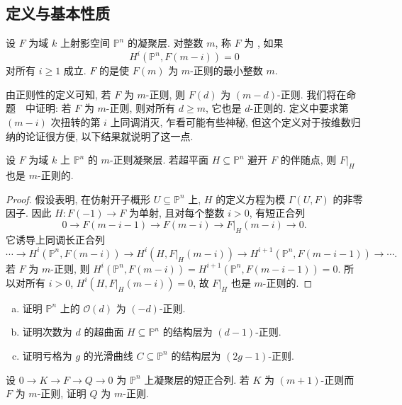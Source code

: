 \subsection{定义与基本性质}\label{src:2.3.1-subsection}
\begin{definition}\label{src:2.3.1}
设 $F$ 为域 $k$ 上射影空间 $\mathbb P^n$ 的凝聚层.
对整数 $m$, 称 $F$ 为 , 如果
\[
H^i(\mathbb P^n,F(m-i))=0
\]
对所有 $i\geq1$ 成立.
$F$ 的是使 $F(m)$ 为 $m$-正则的最小整数 $m$.
\end{definition}
由正则性的定义可知, 若 $F$ 为 $m$-正则, 则 $F(d)$ 为 $(m-d)$-正则.
我们将在命题~~中证明: 若 $F$ 为 $m$-正则, 则对所有 $d\geq m$, 它也是 $d$-正则的.
定义中要求第 $(m-i)$ 次扭转的第 $i$ 上同调消灭, 乍看可能有些神秘, 但这个定义对于按维数归纳的论证很方便, 以下结果就说明了这一点.
\begin{lemma}\label{src:2.3.2}
设 $F$ 为域 $k$ 上 $\mathbb P^n$ 的 $m$-正则凝聚层.
若超平面 $H\subseteq\mathbb P^n$ 避开 $F$ 的伴随点, 则 $F|_H$ 也是 $m$-正则的.
\end{lemma}
\begin{proof}
假设表明, 在仿射开子概形 $U\subseteq\mathbb P^n$ 上, $H$ 的定义方程为模 $\Gamma(U,F)$ 的非零因子.
因此 $H:F(-1)\to F$ 为单射, 且对每个整数 $i>0$, 有短正合列
\[
0\longrightarrow F(m-i-1)\longrightarrow F(m-i)
\longrightarrow F|_H(m-i)\longrightarrow0.
\]
它诱导上同调长正合列
\[
\cdots\longrightarrow H^i(\mathbb P^n,F(m-i))
\longrightarrow H^i(H,F|_H(m-i))
\longrightarrow H^{i+1}(\mathbb P^n,F(m-i-1))\longrightarrow\cdots.
\]
若 $F$ 为 $m$-正则, 则
$H^i(\mathbb P^n,F(m-i))=H^{i+1}(\mathbb P^n,F(m-i-1))=0$.
所以对所有 $i>0$, $H^i(H,F|_H(m-i))=0$, 故 $F|_H$ 也是 $m$-正则的.
\end{proof}
\begin{exercise}[简单, 适合练习]\label{src:2.3.3}
\begin{enumerate}[(a)]
\item 证明 $\mathbb P^n$ 上的 $\mathcal O(d)$ 为 $(-d)$-正则.
\item 证明次数为 $d$ 的超曲面 $H\subseteq\mathbb P^n$ 的结构层为 $(d-1)$-正则.
\item 证明亏格为 $g$ 的光滑曲线 $C\subseteq\mathbb P^n$ 的结构层为 $(2g-1)$-正则.
\end{enumerate}
\end{exercise}
\begin{exercise}[简单]\label{src:2.3.4}
设 $0\to K\to F\to Q\to0$ 为 $\mathbb P^n$ 上凝聚层的短正合列.
若 $K$ 为 $(m+1)$-正则而 $F$ 为 $m$-正则, 证明 $Q$ 为 $m$-正则.
\end{exercise}
